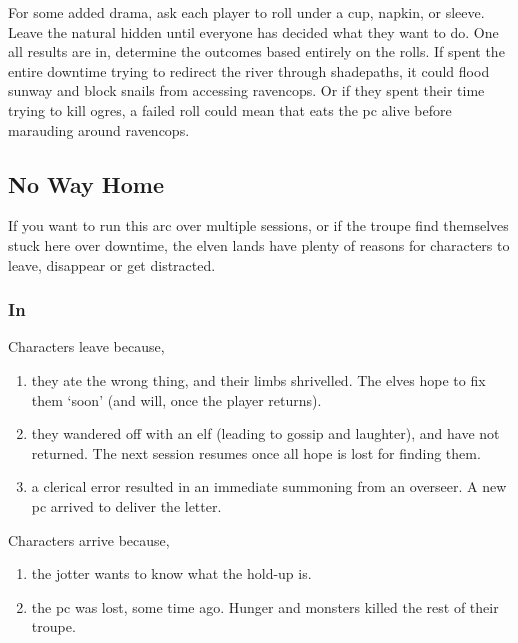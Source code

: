 \begin{multicols}{2}
{  For some added drama, ask each player to roll under a cup, napkin, or sleeve.
  Leave the \gls{natural} hidden until everyone has decided what they want to do.
  One all results are in, determine the outcomes based entirely on the rolls.
  If  spent the entire \gls{downtime} trying to redirect the river through \gls{shadepaths}, it could \gls{flood} \gls{sunway} and block snails from accessing \gls{ravencops}.
  Or if they spent their time trying to kill \glspl{ogre}, a failed roll could mean that  eats the \gls{pc} alive before marauding around \gls{ravencops}.
}{

  \subsection{No Way Home}

  If you want to run this arc over multiple sessions, or if the troupe find themselves stuck here over \gls{downtime}, the elven lands have plenty of reasons for characters to leave, disappear or get distracted.

  \subsubsection{In }

  Characters leave because,

  \begin{enumerate}
    \item
    they ate the wrong thing, and their limbs shrivelled.
    The elves hope to fix them `soon' (and will, once the player returns).
    \item
    they wandered off with an elf (leading to gossip and laughter), and have not returned.
    The next session resumes once all hope is lost for finding them.
    \item
    a clerical error resulted in an immediate summoning from an overseer.
    A new \gls{pc} arrived to deliver the letter.
  \end{enumerate}

  Characters arrive because,

  \begin{enumerate}
    \item
    the \gls{jotter} wants to know what the hold-up is.
    \item
    the \gls{pc} was lost, some time ago.
    Hunger and monsters killed the rest of their troupe.
  \end{enumerate}

}
\end{multicols}
